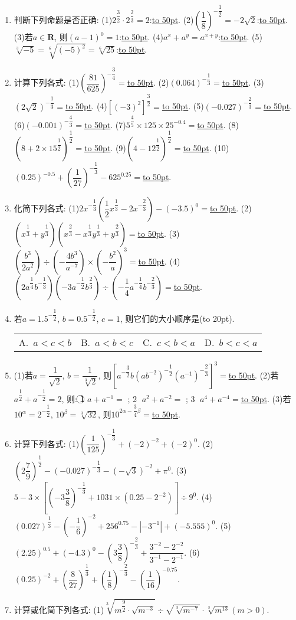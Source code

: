 \documentclass[10pt,a4paper]{article}
\newcommand{\blank}[1]{\underline{\hbox to #1pt{}}}
\newcommand{\bracket}[1]{(\hbox to #1pt{})}
\newcommand{\fourch}[4]{\par\begin{tabular}{p{.23\textwidth}p{.23\textwidth}p{.23\textwidth}p{.23\textwidth}}
A.~#1 &B.~#2& C.~#3& D.~#4
\end{tabular}}
\begin{document}
\begin{enumerate}[1.]
\item 判断下列命题是否正确:
(1)$2^{\dfrac 32}\cdot 2^{\dfrac 23}=2$:\blank{50}.
(2)$(\dfrac 18)^{-\dfrac 12}=-2\sqrt 2$:\blank{50}.
(3)若$a\in \mathbf{R}$, 则$(a-1)^0=1$:\blank{50}.
(4)$a^x+a^y=a^{x+y}$:\blank{50}.
(5)$\sqrt [3]{-5}=\sqrt [6]{(-5)^2}=\sqrt [6]{25}$:\blank{50}.
\item 计算下列各式:
(1)$(\dfrac{81}{625})^{-\dfrac 34}=$\blank{50}.
(2)$(0.064)^{-\dfrac 13}=$\blank{50}.
(3)$(2\sqrt 2)^{-\dfrac 13}=$\blank{50}.
(4)$[ (-3)^2 ]^{\dfrac 32}=$\blank{50}.
(5)$(-0.027)^{-\dfrac 23}=$\blank{50}.
(6)$(-0.001)^{-\dfrac 43}=$\blank{50}.
(7)$5^{\dfrac 45}\times 125\times 25^{-0.4}=$\blank{50}.
(8)$(8+2\times 15^{\dfrac 12})^{\dfrac 12}=$\blank{50}.
(9)$(4-12^{\dfrac 12})^{\dfrac 12}=$\blank{50}.
(10)$(0.25)^{-0.5}+(\dfrac 1{27})^{-\dfrac 13}-625^{0.25}=$\blank{50}.
\item 化简下列各式:
(1)$2x^{-\dfrac 13}(\dfrac 12x^{\dfrac 13}-2x^{-\dfrac 23})-(-3.5)^0=$\blank{50}.
(2)$(x^{\dfrac 13}+y^{\dfrac 13})(x^{\dfrac 23}-x^{\dfrac 13}y^{\dfrac 13}+y^{\dfrac 23})=$\blank{50}.
(3)$(\dfrac{b^3}{2a^2})\div (-\dfrac{4b^3}{a^{-7}})\times (-\dfrac{b^2}a)^3=$\blank{50}.
(4)$(2a^{\dfrac 14}b^{-\dfrac 13})(-3a^{-\dfrac 12}b^{\dfrac 23})\div (-\dfrac 14a^{-\dfrac 14}b^{-\dfrac 23})=$\blank{50}.
\item 若$a=1.5^{-\dfrac 12}$, $b=0.5^{-\dfrac 12}$, $c=1$, 则它们的大小顺序是\bracket{20}.
\fourch{$a<c<b$}{$a<b<c$}{$c<b<a$}{$b<c<a$}
\item (1)若$a=\dfrac 1{\sqrt 2}$, $b=\dfrac 1{\sqrt[3]2}$, 则$[ a^{-\dfrac 32}b(ab^{-2})^{-\dfrac 12}(a^{-1})^{-\dfrac 23} ]^3=$\blank{50}.
(2)若$a^{\dfrac 12}+a^{-\dfrac 12}=2$, 则: \textcircled{1} $a+a^{-1}=$    ; \textcircled{2} $a^2+a^{-2}=$    ; \textcircled{3} $a^4+a^{-4}=$\blank{50}.
(3)若$10^{\alpha }=2^{-\dfrac 12}$, $10^{\beta }=\sqrt [3]{32}$, 则$10^{2\alpha -\dfrac 34\beta }=$\blank{50}.
\item 计算下列各式:
(1)$(\dfrac 1{125})^{-\dfrac 13}+(-2)^{-2}+(-2)^0$.
(2)$(2\dfrac 79)^{\dfrac 12}-(-0.027)^{-\dfrac 13}-(-\sqrt 3)^{-2}+\pi ^0$.
(3)$5-3\times [ (-3\dfrac 38)^{-\dfrac 13}+1031\times (0.25-2^{-2}) ]\div 9^0$.
(4)$(0.027)^{\dfrac 13}-(-\dfrac 16)^{-2}+256^{0.75}-|-3^{-1}|+(-5.555)^0$.
(5)$(2.25)^{0.5}+(-4.3)^0-(3\dfrac 38)^{-\dfrac 23}+\dfrac{3^{-2}-2^{-2}}{3^{-1}-2^{-1}}$.
(6)$(0.25)^{-2}+(\dfrac 8{27})^{\dfrac 13}+(\dfrac 18)^{-\dfrac 23}-(\dfrac 1{16})^{-0.75}$.
\item 计算或化简下列各式:
(1)$\sqrt [3]{m^{\dfrac 92}\cdot \sqrt {m^{-3}}}\div \sqrt {\sqrt [3]{m^{-7}}}\cdot \sqrt [3]{m^{13}}(m>0)$.

\end{enumerate}
\end{document}

